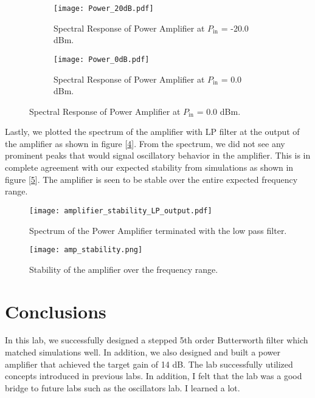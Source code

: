 \documentclass{article}
\begin{document}
\begin{figure}[!htbp]
    \centering  
\begin{subfigure}[b]{0.4\textwidth}
    \texttt{[image: Power\_20dB.pdf]}
    \caption{Spectral Response of Power Amplifier at $P_{\textrm{in}}$ = -20.0 dBm.}
    \label{fig:power20dB}
\end{subfigure}
\begin{subfigure}[b]{0.4\textwidth}
    \texttt{[image: Power\_0dB.pdf]}
    \caption{Spectral Response of Power Amplifier at $P_{\textrm{in}}$ = 0.0 dBm.}
    \label{fig:power0dB}
\end{subfigure}
\end{figure}

Lastly, we plotted the spectrum of the amplifier with LP filter at the output of the amplifier as shown in figure [\ref{fig:ampLPoutplot}]. From the spectrum, we did not see any prominent peaks that would signal oscillatory behavior in the amplifier. This is in complete agreement with our expected stability from simulations as shown in figure [\ref{fig:stability}]. The amplifier is seen to be stable over the entire expected frequency range.

\begin{figure}[!htbp]
    \centering
    \texttt{[image: amplifier\_stability\_LP\_output.pdf]}
    \caption{Spectrum of the Power Amplifier terminated with the low pass filter.}
    \label{fig:ampLPoutplot}
\end{figure}

\begin{figure}[!htbp]
    \centering
    \texttt{[image: amp\_stability.png]}
    \caption{Stability of the amplifier over the frequency range.}
    \label{fig:stability}
\end{figure}

\FloatBarrier
\section*{Conclusions}
In this lab, we successfully designed a stepped 5th order Butterworth filter which matched simulations well. In addition, we also designed and built a power amplifier that achieved the target gain of 14 dB. The lab successfully utilized concepts introduced in previous labs. In addition, I felt that the lab was a good bridge to future labs such as the oscillators lab. I learned a lot.
\end{document}
